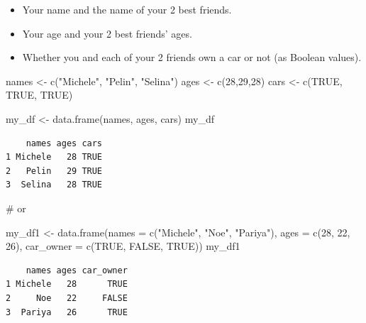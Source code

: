 \documentclass[
  letterpaper,
  DIV=11,
  numbers=noendperiod]{scrartcl}
\newenvironment{Shaded}{\begin{snugshade}}{\end{snugshade}}
\newcommand{\AttributeTok}[1]{\textcolor[rgb]{0.40,0.45,0.13}{#1}}
\newcommand{\CommentTok}[1]{\textcolor[rgb]{0.37,0.37,0.37}{#1}}
\newcommand{\ConstantTok}[1]{\textcolor[rgb]{0.56,0.35,0.01}{#1}}
\newcommand{\DecValTok}[1]{\textcolor[rgb]{0.68,0.00,0.00}{#1}}
\newcommand{\FunctionTok}[1]{\textcolor[rgb]{0.28,0.35,0.67}{#1}}
\newcommand{\NormalTok}[1]{\textcolor[rgb]{0.00,0.23,0.31}{#1}}
\newcommand{\OtherTok}[1]{\textcolor[rgb]{0.00,0.23,0.31}{#1}}
\newcommand{\StringTok}[1]{\textcolor[rgb]{0.13,0.47,0.30}{#1}}
\begin{document}
\begin{itemize}
\item
  Your name and the name of your 2 best friends.
\item
  Your age and your 2 best friends' ages.
\item
  Whether you and each of your 2 friends own a car or not (as Boolean
  values).
\end{itemize}

\begin{Shaded}
\begin{Highlighting}[]
\NormalTok{names }\OtherTok{\textless{}{-}} \FunctionTok{c}\NormalTok{(}\StringTok{"Michele"}\NormalTok{, }\StringTok{"Pelin"}\NormalTok{, }\StringTok{"Selina"}\NormalTok{)}
\NormalTok{ages }\OtherTok{\textless{}{-}} \FunctionTok{c}\NormalTok{(}\DecValTok{28}\NormalTok{,}\DecValTok{29}\NormalTok{,}\DecValTok{28}\NormalTok{)}
\NormalTok{cars }\OtherTok{\textless{}{-}} \FunctionTok{c}\NormalTok{(}\ConstantTok{TRUE}\NormalTok{, }\ConstantTok{TRUE}\NormalTok{, }\ConstantTok{TRUE}\NormalTok{)}

\NormalTok{my\_df }\OtherTok{\textless{}{-}} \FunctionTok{data.frame}\NormalTok{(names, ages, cars)}
\NormalTok{my\_df}
\end{Highlighting}
\end{Shaded}

\begin{verbatim}
    names ages cars
1 Michele   28 TRUE
2   Pelin   29 TRUE
3  Selina   28 TRUE
\end{verbatim}

\begin{Shaded}
\begin{Highlighting}[]
\CommentTok{\# or}

\NormalTok{my\_df1 }\OtherTok{\textless{}{-}} \FunctionTok{data.frame}\NormalTok{(}\AttributeTok{names =} \FunctionTok{c}\NormalTok{(}\StringTok{"Michele"}\NormalTok{, }\StringTok{"Noe"}\NormalTok{, }\StringTok{"Pariya"}\NormalTok{),}
                    \AttributeTok{ages =} \FunctionTok{c}\NormalTok{(}\DecValTok{28}\NormalTok{, }\DecValTok{22}\NormalTok{, }\DecValTok{26}\NormalTok{),}
                    \AttributeTok{car\_owner =} \FunctionTok{c}\NormalTok{(}\ConstantTok{TRUE}\NormalTok{, }\ConstantTok{FALSE}\NormalTok{, }\ConstantTok{TRUE}\NormalTok{))}
\NormalTok{my\_df1}
\end{Highlighting}
\end{Shaded}

\begin{verbatim}
    names ages car_owner
1 Michele   28      TRUE
2     Noe   22     FALSE
3  Pariya   26      TRUE
\end{verbatim}
\end{document}
